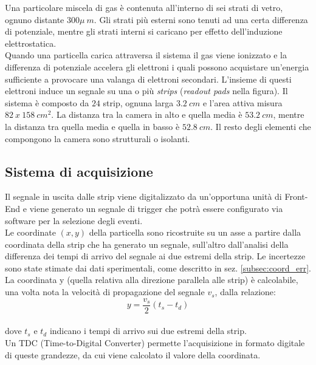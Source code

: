 \documentclass[8pt]{extarticle}
\begin{document}
Una particolare miscela di gas è contenuta all'interno di sei strati di vetro, ognuno distante $300 \mu \ m$. Gli strati più esterni sono tenuti ad una certa differenza di potenziale, mentre gli strati interni si caricano per effetto dell'induzione elettrostatica. \\
Quando una particella carica attraversa il sistema il gas viene ionizzato e la differenza di potenziale accelera gli elettroni i quali possono acquistare un'energia sufficiente a 
provocare una valanga di elettroni secondari. L'insieme di questi elettroni induce un segnale su una o più \textit{strips} (\textit{readout pads} nella figura). Il sistema è composto da $24$ strip, ognuna larga $3.2 \ cm$ e l'area attiva misura $82 \ x \ 158 \ cm^2$. La distanza tra la camera in alto e quella media è $53.2 \ cm$, mentre la distanza tra quella media e quella in basso è $52.8 \ cm$.  Il resto degli elementi che compongono la camera sono strutturali o isolanti. \\

\subsection{Sistema di acquisizione}
Il segnale in uscita dalle strip viene digitalizzato da un'opportuna unità di Front-End e viene generato un segnale di trigger che potrà essere configurato via software per la selezione degli eventi.\\

Le coordinate $(x,y)$ della particella sono ricostruite su un asse a partire dalla coordinata della strip che ha generato un segnale, sull'altro dall'analisi della differenza dei tempi di arrivo del segnale ai due estremi della strip. Le incertezze sono state stimate dai dati sperimentali, come descritto in sez. \ref{subsec:coord_err}. \\

La coordinata y (quella relativa alla direzione parallela alle strip) è calcolabile, una volta nota la velocità di propagazione del segnale $v_s$, dalla relazione: \\
\[y = \frac{v_s}{2} (t_s - t_d) \] \\

dove $t_s$ e $t_d$ indicano i tempi di arrivo sui due estremi della strip. \\
Un TDC (Time-to-Digital Converter) permette l'acquisizione in formato digitale di queste grandezze, da cui viene calcolato il valore della coordinata. \\
\end{document}

